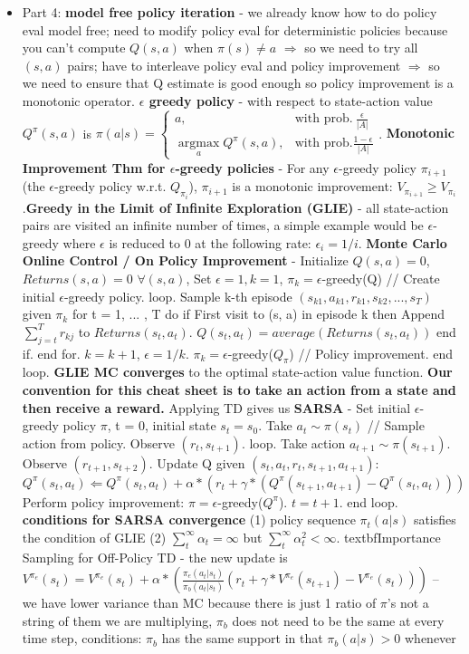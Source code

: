 \documentclass{article}
\begin{document}
\begin{itemize}
\item Part 4: \textbf{model free policy iteration} - we already know how to do policy eval model free; need to modify policy eval for deterministic policies because you can't compute $Q(s,a)$ when $\pi(s) \neq a$ $\Rightarrow$ so we need to try all $(s,a)$ pairs; have to interleave policy eval and policy improvement $\Rightarrow$ so we need to ensure that Q estimate is good enough so policy improvement is a monotonic operator. \textbf{$\epsilon$ greedy policy} -  with respect to state-action value $Q^\pi(s,a)$ is $\pi(a|s) = \begin{cases} a, & \text{with prob.}\ \frac{\epsilon}{|A|} \\ \underset{a}{\operatorname{argmax}} Q^\pi(s,a), & \text{with prob.} \frac{1 - \epsilon}{|A|} \end{cases}$. \textbf{Monotonic Improvement Thm for $\epsilon$-greedy policies} - For any $\epsilon$-greedy policy $\pi_{i+1}$ (the $\epsilon$-greedy policy w.r.t. $Q_{\pi_i}$), $\pi_{i+1}$ is a monotonic improvement: $V_{\pi_{i+1}} \geq V_{\pi_i}$.\textbf{Greedy in the Limit of Infinite Exploration (GLIE)} - all state-action pairs are visited an infinite number of times, a simple example would be $\epsilon$-greedy where $\epsilon$ is reduced to 0 at the following rate: $\epsilon_i = 1/i$. \textbf{Monte Carlo Online Control / On Policy Improvement} - Initialize $Q(s, a) = 0$, $Returns(s, a) = 0$ $\forall (s, a)$, Set $\epsilon = 1, k = 1$, $\pi_k = \epsilon$-greedy(Q) // Create initial $\epsilon$-greedy policy. loop. Sample k-th episode $(s_{k1}, a_{k1},r_{k1},s_{k2}, ... ,s_T)$ given $\pi_k$ for t = 1, ... , T do if First visit to (s, a) in episode k then Append $\sum_{j=t}^T r_{kj}$ to $Returns(s_t, a_t)$. $Q(s_t, a_t) = average(Returns(s_t, a_t))$ end if. end for. $k = k + 1$, $\epsilon = 1/k$. $\pi_k = \epsilon$-greedy($Q_\pi$) // Policy improvement. end loop. \textbf{GLIE MC converges} to the optimal state-action value function. \textbf{Our convention for this cheat sheet is to take an action from a state and then receive a reward.} Applying TD gives us \textbf{SARSA} - Set initial $\epsilon$-greedy policy $\pi$, t = 0, initial state $s_t = s_0$. Take $a_t \sim \pi(s_t)$ // Sample action from policy. Observe $(r_t, s_{t+1})$. loop. Take action $a_{t+1} \sim \pi(s_{t+1})$. Observe $(r_{t+1}, s_{t+2})$. Update Q given $(s_t, a_t ,r_t, s_{t+1}, a_{t+1})$: $Q^\pi(s_t, a_t) \Leftarrow Q^\pi(s_t, a_t) + \alpha*(r_t + \gamma*(Q^\pi(s_{t+1}, a_{t+1}) - Q^\pi(s_t, a_t)))$ Perform policy improvement: $\pi = \epsilon$-greedy($Q^\pi$). $t = t + 1$. end loop. \textbf{conditions for SARSA convergence} (1) policy sequence $\pi_t(a|s)$ satisfies the condition of GLIE (2) $\sum_t^{\infty} \alpha_t = \infty$ but $\sum_t^{\infty} \alpha_t^2 < \infty$. textbf{Importance Sampling for Off-Policy TD} - the new update is $V^{\pi_e}(s_t) = V^{\pi_e}(s_t) + \alpha*(\frac{\pi_e(a_t|s_t)}{\pi_b(a_t|s_t)}(r_t + \gamma*V^{\pi_e}(s_{t+1})-V^{\pi_e}(s_t)))$ -- we have lower variance than MC because there is just 1 ratio of $\pi$'s not a string of them we are multiplying, $\pi_b$ does not need to be the same at every time step, conditions: $\pi_b$ has the same support in that $\pi_b(a|s) > 0$ whenever 
\end{itemize}
\end{document}
